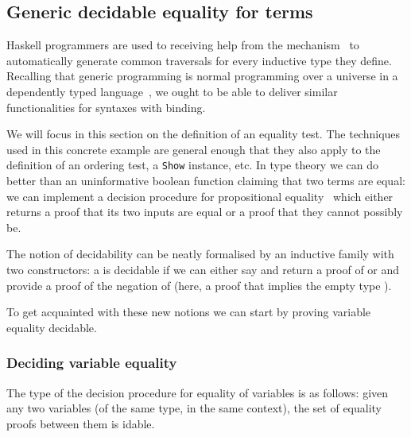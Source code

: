 \subsection{Generic decidable equality for terms}

Haskell programmers are used to receiving help from the 
mechanism~\cite{DBLP:journals/entcs/HinzeJ00,DBLP:conf/haskell/MagalhaesDJL10}
to automatically generate common traversals for every inductive type
they define. Recalling that generic programming is normal programming
over a universe in a dependently typed
language~\cite{DBLP:conf/ifip2-1/AltenkirchM02}, we ought to be able to
deliver similar functionalities for syntaxes with binding.

We will focus in this section on the definition of an equality test. The
techniques used in this concrete example are general enough that they also
apply to the definition of an ordering test, a \texttt{Show} instance, etc.
In type theory we can do better than an uninformative boolean function
claiming that two terms are equal: we can implement a decision procedure
for propositional equality~\cite{DBLP:conf/icfp/LohM11} which either
returns a proof that its two inputs are equal or a proof that they
cannot possibly be.

The notion of decidability can be neatly formalised by an inductive family
with two constructors: a   is decidable if we can either say
 and return a proof of  or  and provide a proof of
the negation of  (here, a proof that  implies the empty type
).

\noindent
\begin{minipage}{\textwidth}
  \begin{minipage}[t]{0.45\textwidth}
  \end{minipage}
  \begin{minipage}[t]{0.45\textwidth}
  \end{minipage}
\end{minipage}

\noindent To get acquainted with these new notions we can start by proving variable equality decidable.

\subsubsection{Deciding variable equality}

The type of the decision procedure for equality of variables is as follows:
given any two variables (of the same type, in the same context), the set of
equality proofs between them is idable.

